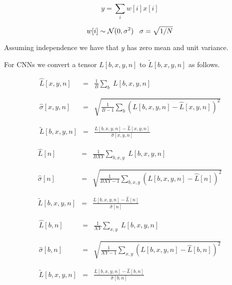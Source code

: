 {

$$y = \sum_i w[i]x[i]$$

\vfill
$$w[i] \sim {\cal N}(0,\sigma^2)\;\;\;\sigma = \sqrt{1/N}$$

\vfill
Assuming independence we have that $y$ has zero mean and unit variance.


For CNNs we convert a tensor $L[b,x,y,n]$ to $\tilde{L}[b,x,y,n]$ as follows.

\begin{eqnarray*}
  \hat{L}[x,y,n] & = & \frac{1}{B} \sum_{b}\;L[b,x,y,n] \\
  \\
  \\
  \hat{\sigma}[x,y,n] & = & \sqrt{\frac{1}{B-1} \sum_{b} (L[b,x,y,n]-\hat{L}[x,y,n])^2} \\
  \\
  \\
  \tilde{L}[b,x,y,n]& = & \frac{L[b,x,y,n] - \hat{L}[x,y,n]}{\hat{\sigma}[x,y,n]}
\end{eqnarray*}



\begin{eqnarray*}
  \hat{L}[n] & = & \frac{1}{BXY} \sum_{b,x,y}\;L[b,x,y,n] \\
  \\
  \\
  \hat{\sigma}[n] & = & \sqrt{\frac{1}{BXY-1} \sum_{b,x,y} (L[b,x,y,n]-\hat{L}[n])^2} \\
  \\
  \\
  \tilde{L}[b,x,y,n]& = & \frac{L[b,x,y,n] - \hat{L}[n]}{\hat{\sigma}[n]}
\end{eqnarray*}


\begin{eqnarray*}
  \hat{L}[b,n] & = & \frac{1}{XY} \sum_{x,y}\;L[b,x,y,n] \\
  \\
  \\
  \hat{\sigma}[b,n] & = & \sqrt{\frac{1}{XY-1} \sum_{x,y} (L[b,x,y,n]-\hat{L}[b,n])^2} \\
  \\
  \\
  \tilde{L}[b,x,y,n]& = & \frac{L[b,x,y,n] - \hat{L}[b,n]}{\hat{\sigma}[b,n]}
\end{eqnarray*}

}
